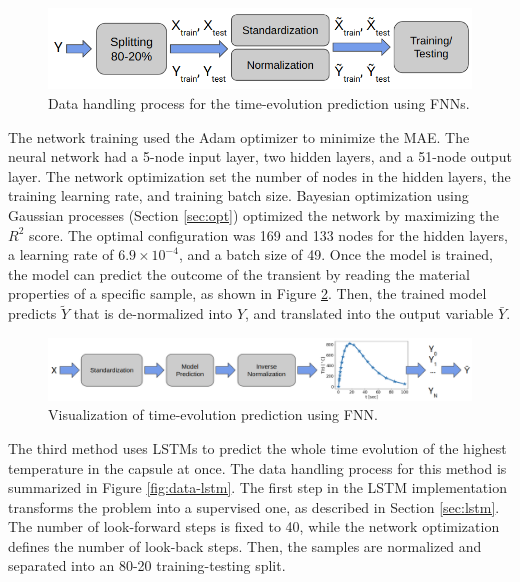 \begin{figure}[htbp!] %
  \centering
  \includegraphics[width=0.7\linewidth]{figures/data-pross-fnn}
  \caption{Data handling process for the time-evolution prediction using FNNs.}
  \label{fig:data-fnn}
\end{figure}

The network training used the Adam optimizer to minimize the \gls*{MAE}.
The neural network had a 5-node input layer, two hidden layers, and a 51-node output layer.
The network optimization set the number of nodes in the hidden layers, the training learning rate, and training batch size.
Bayesian optimization using Gaussian processes (Section \ref{sec:opt}) optimized the network by maximizing the $R^2$ score.
The optimal configuration was 169 and 133 nodes for the hidden layers, a learning rate of $6.9 \times 10^{-4}$, and a batch size of 49.
Once the model is trained, the model can predict the outcome of the transient by reading the material properties of a specific sample, as shown in Figure \ref{fig:data-reg2}.
Then, the trained model predicts $\tilde{Y}$ that is de-normalized into $Y$, and translated into the output variable $\bar{Y}$.

\begin{figure}[htbp!] %
  \centering
  \includegraphics[width=0.7\linewidth]{figures/data-prediction-fnn}
  \caption{Visualization of time-evolution prediction using FNN.}
  \label{fig:data-reg2}
\end{figure}

The third method uses LSTMs to predict the whole time evolution of the highest temperature in the capsule at once.
The data handling process for this method is summarized in Figure \ref{fig:data-lstm}.
The first step in the LSTM implementation transforms the problem into a supervised one, as described in Section \ref{sec:lstm}.
The number of look-forward steps is fixed to 40, while the network optimization defines the number of look-back steps.
Then, the samples are normalized and separated into an 80-20 training-testing split.

